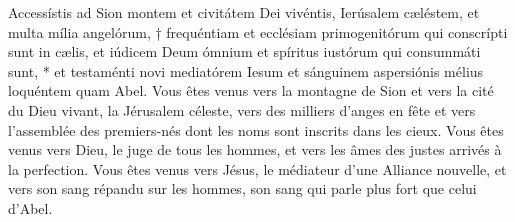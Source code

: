 \documentclass[Session2024.tex]{subfiles}
\begin{document}







{Accessístis ad Sion montem et civitátem Dei vivéntis, Ierúsalem
cæléstem, et multa mília angelórum, † frequéntiam et ecclésiam
primogenitórum qui conscrípti sunt in cælis, et iúdicem Deum ómnium et
spíritus iustórum qui consummáti sunt, * et testaménti novi mediatórem
Iesum et sánguinem aspersiónis mélius loquéntem quam Abel.}
{Vous êtes venus vers la montagne de Sion et vers la cité du Dieu vivant,
la Jérusalem céleste, vers des milliers d’anges en fête et vers l’assemblée
des premiers-nés dont les noms sont inscrits dans les cieux. Vous êtes
venus vers Dieu, le juge de tous les hommes, et vers les âmes des justes
arrivés à la perfection. Vous êtes venus vers Jésus, le médiateur d’une
Alliance nouvelle, et vers son sang répandu sur les hommes, son sang qui
parle plus fort que celui d’Abel.}




\label{TO16}


\end{document}
